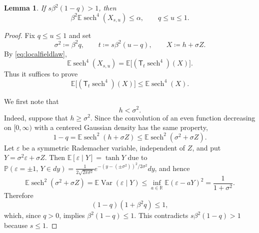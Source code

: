 \documentclass[11pt]{article}
\newtheorem{lemma}[theorem]{Lemma}
\numberwithin{equation}{section}
\newcommand{\E}{\mathbb{E}}
\newcommand{\R}{\mathbb{R}}
\newcommand{\1}{\mathbf 1}
\newcommand{\sech}{\operatorname{sech}}
\begin{document}
\begin{lemma}
\label{lem:uppercomparison}
If $s\beta^2(1-q)>1$, then
\begin{equation}
 \beta^2\E\sech^4(X_{s,u})\le\alpha,
 \qquad q\le u\le1.
 \label{eq:uppercomparison}
\end{equation}
\end{lemma}



\begin{proof}
Fix $q\le u\le1$ and set
\[
 \sigma^2\coloneqq\beta^2q,
 \qquad
 t\coloneqq s\beta^2(u-q),
 \qquad
 X\coloneqq h+\sigma Z.
\]
By \eqref{eq:localfieldlaw},
\[
 \E\sech^4(X_{s,u})
 =
 \E\bigl[(\mathsf T_t\sech^4)(X)\bigr].
\]
Thus it suffices to prove
\[
 \E\bigl[(\mathsf T_t\sech^4)(X)\bigr]
 \le
 \E\sech^4(X).
\]

We first note that
\begin{equation}
 h<\sigma^2.
 \label{eq:h-less-sigma}
\end{equation}
Indeed, suppose that $h\ge\sigma^2$. Since the convolution of an even
function decreasing on $[0,\infty)$ with a centered Gaussian density has
the same property,
\[
 1-q
 =
 \E\sech^2(h+\sigma Z)
 \le
 \E\sech^2(\sigma^2+\sigma Z).
\]
Let $\varepsilon$ be a symmetric Rademacher variable, independent of $Z$,
and put $Y=\sigma^2\varepsilon+\sigma Z$. Then
$\E[\varepsilon\mid Y]=\tanh Y$ due to $\mathbb P(\varepsilon=\pm 1,\,Y\in dy) = \frac{1}{2\sqrt{2\pi \sigma^2}}e^{-(y - (\pm \sigma^2) )^2/2\sigma^2} dy$, and hence
\[
 \E\sech^2(\sigma^2+\sigma Z)
 =
 \E\operatorname{Var}(\varepsilon\mid Y)
 \le
 \inf_{a\in\R}\E(\varepsilon-aY)^2
 =
 \frac{1}{1+\sigma^2}.
\]
Therefore
\[
 (1-q)(1+\beta^2q)\le1,
\]
which, since $q>0$, implies $\beta^2(1-q)\le1$. This contradicts
$s\beta^2(1-q)>1$ because $s\le1$.


\end{proof}
\end{document}
